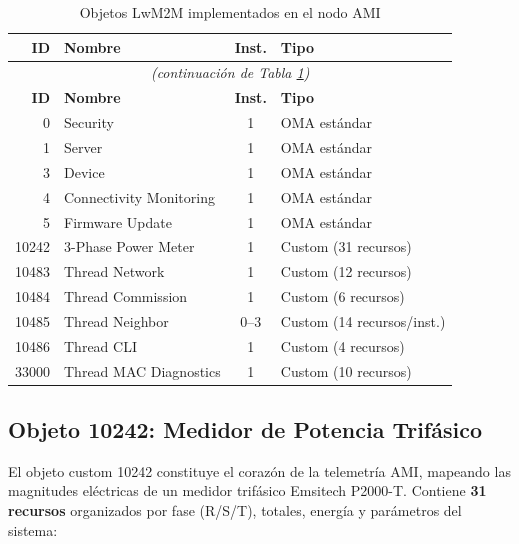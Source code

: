 \documentclass[11pt,a4paper]{article}
\begin{document}
\begin{longtable}{r l c l}
\caption{Objetos LwM2M implementados en el nodo AMI} \label{tab:objetos} \\
\toprule
\textbf{ID} & \textbf{Nombre} & \textbf{Inst.} & \textbf{Tipo} \\
\midrule
\endfirsthead
\multicolumn{4}{c}{\textit{(continuación de Tabla \ref{tab:objetos})}} \\
\toprule
\textbf{ID} & \textbf{Nombre} & \textbf{Inst.} & \textbf{Tipo} \\
\midrule
\endhead
0 & Security & 1 & OMA estándar \\
1 & Server & 1 & OMA estándar \\
3 & Device & 1 & OMA estándar \\
4 & Connectivity Monitoring & 1 & OMA estándar \\
5 & Firmware Update & 1 & OMA estándar \\
10242 & 3-Phase Power Meter & 1 & Custom (31 recursos) \\
10483 & Thread Network & 1 & Custom (12 recursos) \\
10484 & Thread Commission & 1 & Custom (6 recursos) \\
10485 & Thread Neighbor & 0--3 & Custom (14 recursos/inst.) \\
10486 & Thread CLI & 1 & Custom (4 recursos) \\
33000 & Thread MAC Diagnostics & 1 & Custom (10 recursos) \\
\bottomrule
\end{longtable}

\subsection{Objeto 10242: Medidor de Potencia Trifásico}

El objeto custom 10242 constituye el corazón de la telemetría AMI, mapeando las magnitudes eléctricas de un medidor trifásico Emsitech P2000-T. Contiene \textbf{31 recursos} organizados por fase (R/S/T), totales, energía y parámetros del sistema:
\end{document}
